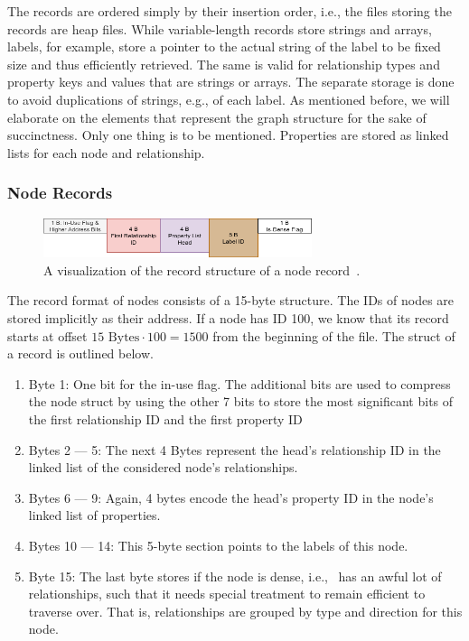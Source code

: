         The records are ordered simply by their insertion order, i.e., the files storing the records are heap files.
        While variable-length records store strings and arrays, labels, for example, store a pointer to the actual string of the label to be fixed size and thus efficiently retrieved.
        The same is valid for relationship types and property keys and values that are strings or arrays.
        The separate storage is done to avoid duplications of strings, e.g., of each label.
        As mentioned before, we will elaborate on the elements that represent the graph structure for the sake of succinctness. 
        Only one thing is to be mentioned.
        Properties are stored as linked lists for each node and relationship.
        
    \subsubsection*{Node Records}
        \begin{figure}[htp]
            \begin{center}
                \includegraphics[keepaspectratio,height=0.4\textheight,width=0.7\textwidth]{img/04-databases/node_record.png}
            \end{center}
            \caption{A visualization of the record structure of a node record~\autocite{neo4jNodeRecordFormat}.}
            \label{node-record-format}
        \end{figure}
        The record format of nodes consists of a 15-byte structure.
        The IDs of nodes are stored implicitly as their address.
        If a node has ID 100, we know that its record starts at offset $15 \text{ Bytes} \cdot 100 = 1500$ from the beginning of the file.
        The struct of a record is outlined below.
        \begin{enumerate}
            \item Byte 1: One bit for the in-use flag. 
            The additional bits are used to compress the node struct by using the other 7 bits to store the most significant bits of the first relationship ID and the first property ID 
            \item Bytes 2 --- 5: The next 4 Bytes represent the head's relationship ID in the linked list of the considered node's relationships.
            \item Bytes 6 --- 9: Again, 4 bytes encode the head's property ID in the node's linked list of properties.
            \item Bytes 10 --- 14: This 5-byte section points to the labels of this node.
            \item Byte 15: The last byte stores if the node is dense, i.e., \ has an awful lot of relationships, such that it needs special treatment to remain efficient to traverse over.
            That is, relationships are grouped by type and direction for this node.
        \end{enumerate}
        
